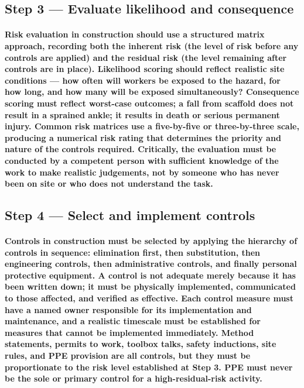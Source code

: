 \subsection{Step 3 --- Evaluate likelihood and consequence}
\paragraph{Risk evaluation in construction should use a structured matrix approach, recording both the inherent risk (the level of risk before any controls are applied) and the residual risk (the level remaining after controls are in place). Likelihood scoring should reflect realistic site conditions --- how often will workers be exposed to the hazard, for how long, and how many will be exposed simultaneously? Consequence scoring must reflect worst-case outcomes; a fall from scaffold does not result in a sprained ankle; it results in death or serious permanent injury. Common risk matrices use a five-by-five or three-by-three scale, producing a numerical risk rating that determines the priority and nature of the controls required. Critically, the evaluation must be conducted by a competent person with sufficient knowledge of the work to make realistic judgements, not by someone who has never been on site or who does not understand the task.}

\subsection{Step 4 --- Select and implement controls}
\paragraph{Controls in construction must be selected by applying the hierarchy of controls in sequence: elimination first, then substitution, then engineering controls, then administrative controls, and finally personal protective equipment. A control is not adequate merely because it has been written down; it must be physically implemented, communicated to those affected, and verified as effective. Each control measure must have a named owner responsible for its implementation and maintenance, and a realistic timescale must be established for measures that cannot be implemented immediately. Method statements, permits to work, toolbox talks, safety inductions, site rules, and PPE provision are all controls, but they must be proportionate to the risk level established at Step 3. PPE must never be the sole or primary control for a high-residual-risk activity.}

